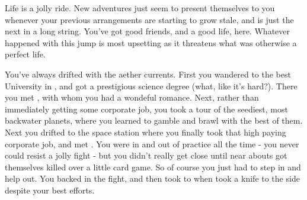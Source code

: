 \documentclass[char]{TMFHope}
\begin{document}
\name{\cSci{}}

Life is a jolly ride. New adventures just seem to present themselves to you whenever your previous arrangements are starting to grow stale, and \pNew{} is just the next in a long string. You've got good friends, and a good life, here. Whatever happened with this jump is most upsetting as it threatens what was otherwise a perfect life.

You've always drifted with the aether currents. First you wandered to the best University in \pPlan{}, and got a prestigious science degree (what, like it's hard?). There you met \cXO{}, with whom you had a wondeful romance. Next, rather than immediately getting some corporate job, you took a tour of the seediest, most backwater \pEdge{} planets, where you learned to gamble and brawl with the best of them. Next you drifted to the space station where you finally took that high paying corporate job, and met \cMed{}. You were in and out of \cMed{\their} practice all the time - you never could resist a jolly fight - but you didn't really get close until \cCap{} near abouts got themselves killed over a little card game. So of course you just had to step in and help \cCap{\them} out. You backed \cCap{} in the fight, and then took \cCap{\them} to \cMed{} when  took a knife to the side despite your best efforts. 
\end{document}
